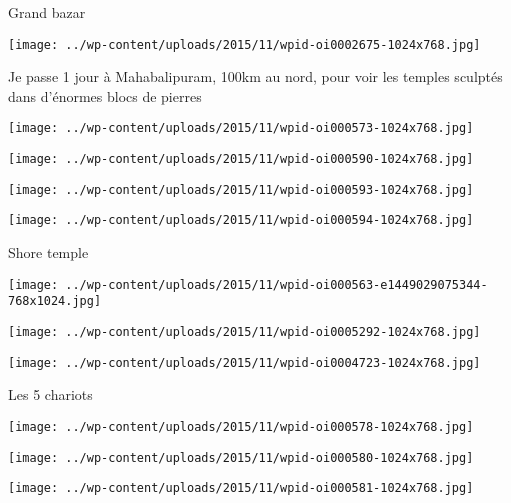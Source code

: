  Grand bazar \newline
 \newline
\centerline{\texttt{[image: ../wp-content/uploads/2015/11/wpid-oi0002675-1024x768.jpg]} } 
 \newline
 Je passe 1 jour à Mahabalipuram, 100km au nord, pour voir les temples sculptés dans d'énormes blocs de pierres \newline
 \newline
\centerline{\texttt{[image: ../wp-content/uploads/2015/11/wpid-oi000573-1024x768.jpg]} } 
 \newline
 \newline
\centerline{\texttt{[image: ../wp-content/uploads/2015/11/wpid-oi000590-1024x768.jpg]} } 
 \newline
 \newline
\centerline{\texttt{[image: ../wp-content/uploads/2015/11/wpid-oi000593-1024x768.jpg]} } 
 \newline
 \newline
\centerline{\texttt{[image: ../wp-content/uploads/2015/11/wpid-oi000594-1024x768.jpg]} } 
 \newline
 Shore temple \newline
 \newline
\centerline{\texttt{[image: ../wp-content/uploads/2015/11/wpid-oi000563-e1449029075344-768x1024.jpg]} } 
 \newline
 \newline
\centerline{\texttt{[image: ../wp-content/uploads/2015/11/wpid-oi0005292-1024x768.jpg]} } 
 \newline
 \newline
\centerline{\texttt{[image: ../wp-content/uploads/2015/11/wpid-oi0004723-1024x768.jpg]} } 
 \newline
 Les 5 chariots \newline
 \newline
\centerline{\texttt{[image: ../wp-content/uploads/2015/11/wpid-oi000578-1024x768.jpg]} } 
 \newline
 \newline
\centerline{\texttt{[image: ../wp-content/uploads/2015/11/wpid-oi000580-1024x768.jpg]} } 
 \newline
 \newline
\centerline{\texttt{[image: ../wp-content/uploads/2015/11/wpid-oi000581-1024x768.jpg]} } 
 \newline
